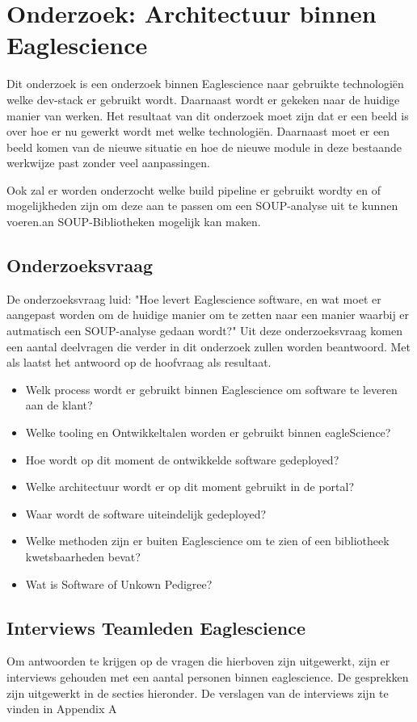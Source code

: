 \chapter{Onderzoek: Architectuur binnen Eaglescience}\label{ch:onderzoek:-architectuur-binnen-eaglescience} %
Dit onderzoek is een onderzoek binnen Eaglescience naar gebruikte technologiën welke dev-stack er gebruikt wordt.
Daarnaast wordt er gekeken naar de huidige manier van werken.
Het resultaat van dit onderzoek moet zijn dat er een beeld is over hoe er nu gewerkt wordt met welke technologiën.
Daarnaast moet er een beeld komen van de nieuwe situatie en hoe de nieuwe module in deze bestaande werkwijze past zonder veel aanpassingen.

Ook zal er worden onderzocht welke build pipeline er gebruikt wordty en of mogelijkheden zijn om deze aan te passen om een SOUP-analyse uit te kunnen voeren.an SOUP-Bibliotheken mogelijk kan maken.
\section{Onderzoeksvraag}\label{sec:onderzoeksvraag}
De onderzoeksvraag luid: "Hoe levert Eaglescience software, en wat moet er aangepast worden om de huidige manier om te zetten naar een manier waarbij er autmatisch een SOUP-analyse gedaan wordt?" Uit deze onderzoeksvraag komen een aantal deelvragen die verder in dit onderzoek zullen worden beantwoord.
Met als laatst het antwoord op de hoofvraag als resultaat.

\begin{itemize}
  \item Welk process wordt er gebruikt binnen Eaglescience om software te leveren aan de klant?
  \item Welke tooling en Ontwikkeltalen worden er gebruikt binnen eagleScience?
  \item Hoe wordt op dit moment de ontwikkelde software gedeployed?
  \item Welke architectuur wordt er op dit moment gebruikt in de portal?
  \item Waar wordt de software uiteindelijk gedeployed?
  \item Welke methoden zijn er buiten Eaglescience om te zien of een bibliotheek kwetsbaarheden bevat?
  \item Wat is Software of Unkown Pedigree?
\end{itemize}

\section{Interviews Teamleden Eaglescience}\label{sec:interviews-teamleden-eaglescience}
Om antwoorden te krijgen op de vragen die hierboven zijn uitgewerkt, zijn er interviews gehouden met een aantal personen binnen eaglescience.
De gesprekken zijn uitgewerkt in de secties hieronder.
De verslagen van de interviews zijn te vinden in Appendix A

